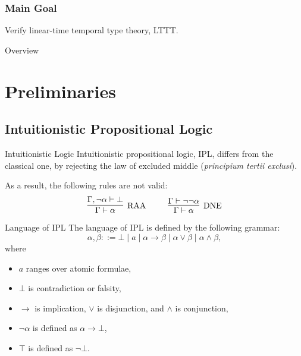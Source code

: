 \begin{frame}[t,plain]
\titlepage
\end{frame}

\renewcommand{\colon}{\mbox{~:~}}

\newcommand{\ang}[1]{\left\langle #1 \right\rangle}
\newcommand{\ceil}[1]{\left\lceil #1 \right\rceil}
\newcommand{\floor}[1]{\left\lfloor #1 \right\rfloor}
\renewcommand{\diamond}{\lozenge}
\newcommand{\T}{\mathfrak{T}}
\newcommand{\A}{\mathfrak{A}}
\renewcommand{\t}{\mathfrak{t}}
\newcommand{\e}{\mathfrak{e}}
\renewcommand{\v}{\mathfrak{v}}
\newcommand{\n}{\mathfrak{n}}
\newcommand{\dbrack}[1]{\left\llbracket #1 \right\rrbracket}

\begin{frame}[fragile]
    \frametitle{Main Goal}
  
    Verify linear-time temporal type theory, LTTT.
\end{frame}

\begin{frame}{Overview}
\tableofcontents
\end{frame}

\section{Preliminaries}

\subsection{Intuitionistic Propositional Logic}

\begin{frame}{Intuitionistic Logic}
    Intuitionistic propositional logic, IPL, differs from the classical one, by rejecting the law of excluded middle (\textit{principium tertii exclusi}).
    
    As a result, the following rules are not valid:
    \[
    \infer[\mbox{RAA}]{\Gamma \vdash \alpha}{\Gamma, \neg\alpha \vdash \bot}
    ~~~~ ~~~~
    \infer[\mbox{DNE}]{\Gamma \vdash \alpha}{\Gamma \vdash \neg\neg\alpha}
    \]
\end{frame}

\begin{frame}{Language of IPL}
    The language of IPL is defined by the following grammar:
    \[
    \alpha, \beta ::= \bot \mid a \mid \alpha \rightarrow \beta \mid \alpha \vee \beta \mid \alpha \wedge \beta,
    \]
    where
    \begin{itemize}
        \item $a$ ranges over atomic formulae,
        \item $\bot$ is contradiction or falsity,
        \item $\rightarrow$ is implication, $\vee$ is disjunction, and $\wedge$ is conjunction,
        \item $\neg\alpha$ is defined as $\alpha \rightarrow \bot$,
        \item $\top$ is defined as $\neg\bot$.
    \end{itemize}
\end{frame}

